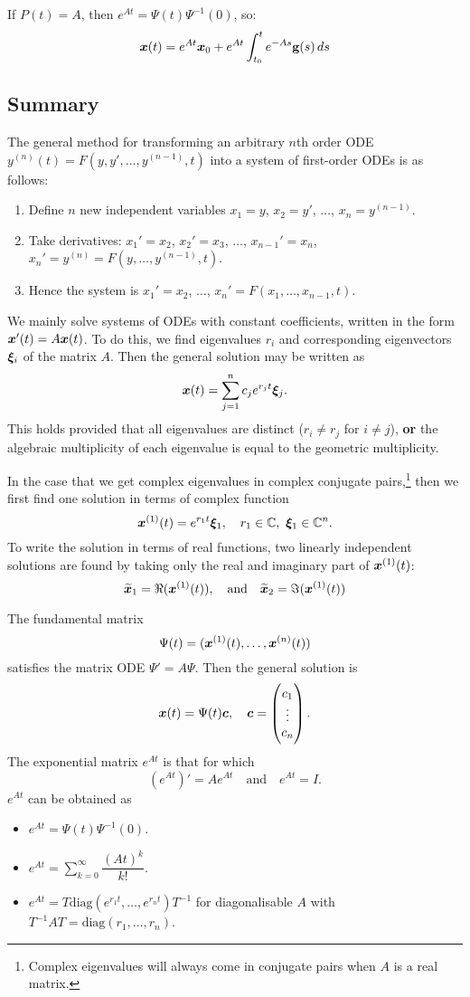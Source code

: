 \begin{remark}
	If $P(t) = A$, then $e^{At} = \Psi(t) \Psi^{-1}(0)$, so:
	\[
	\bm{x}(t) = e^{At} \bm{x}_0 + e^{At} \int_{t_0}^t e^{-As} \textbf{g}(s)\,ds
	\]
\end{remark}

\pagebreak
\subsection{Summary}

The general method for transforming an arbitrary $n$th order ODE $y^{(n)}(t) = F(y, y', \ldots, y^{(n-1)}, t)$ into a system of first-order ODEs is as follows:
\begin{enumerate}
	\item Define $n$ new independent variables $x_1 = y$, $x_2 = y'$, $\ldots$, $x_n = y^{(n-1)}$.
	\item{Take derivatives: $x_1' = x_2$, $x_2' = x_3$, $\ldots$, $x_{n-1}' = x_n$, $x_n' = y^{(n)} = F(y, \ldots, y^{(n-1)}, t)$.}
	\item{Hence the system is $x_1' = x_2$, $\ldots$, $x_n' = F(x_1, \ldots, x_{n-1}, t)$.}
\end{enumerate}

We mainly solve systems of ODEs with constant coefficients, written in the form $\bm{x}'(t) = A\bm{x}(t)$. To do this, we find eigenvalues $r_i$ and corresponding eigenvectors $\bm{\xi}_i$ of the matrix $A$. Then the general solution may be written as
\[
\bm{x}(t) = \sum_{j=1}^n c_j e^{r_jt} \bm{\xi}_j.
\]
This holds provided that all eigenvalues are distinct ($r_i \neq r_j$ for $i \neq j$), \textbf{or} the algebraic multiplicity of each eigenvalue is equal to the geometric multiplicity.

In the case that we get complex eigenvalues in complex conjugate pairs,\footnote{Complex eigenvalues will always come in conjugate pairs when $A$ is a real matrix.} then we first find one solution in terms of complex function
\[
\bm{x}^{(1)}(t) = e^{r_1t}\bm{\xi}_1, \quad r_1 \in \mathbb{C}, \,\,\bm{\xi}_1 \in \mathbb{C}^n.
\]
To write the solution in terms of real functions, two linearly independent solutions are found by taking only the real and imaginary part of $\bm{x}^{(1)}(t)$:
\[
\widetilde{\bm{x}}_1 = \Re(\bm{x}^{(1)}(t)), \quad \text{and} \quad \widetilde{\bm{x}}_2 = \Im(\bm{x}^{(1)}(t))
\]

The fundamental matrix
\[
\Psi(t) = (\bm{x}^{(1)}(t), \dots, \bm{x}^{(n)}(t))
\]
satisfies the matrix ODE $\Psi' = A\Psi$. Then the general solution is
\[
\bm{x}(t) = \Psi(t) \bm{c}, \quad \bm{c} = \begin{pmatrix}c_1 \\ \vdots \\ c_n\end{pmatrix}.
\]
The exponential matrix $e^{At}$ is that for which
\[
\left(e^{At}\right)' = Ae^{At} \quad \text{and} \quad e^{At} = I.
\]
$e^{At}$ can be obtained as
\begin{itemize}
	\item $e^{At} = \Psi(t)\Psi^{-1}(0)$.
	\item $e^{At} = \sum\limits_{k=0}^{\infty} \dfrac{(At)^k}{k!}$.
	\item $e^{At} = T \text{diag}(e^{r_1t}, \dots, e^{r_nt})T^{-1}$ for diagonalisable $A$ with $T^{-1}AT = \text{diag}(r_1, \dots, r_n)$.
\end{itemize}

